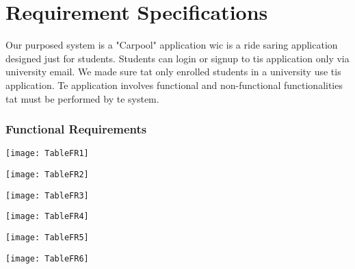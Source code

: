 \chapter{Requirement Specifications} \label{cap:reqs}

Our purposed system is a "Carpool" application wic is a ride saring application designed just for students. Students can login or signup to tis application only via university email. We made sure tat only enrolled students in a university use tis application. Te application involves functional and non-functional functionalities tat must be performed by te system.

\subsection{Functional Requirements}

\begin{center}

\centering
\texttt{[image: TableFR1]}
\end{center}

\begin{center}

\centering
\texttt{[image: TableFR2]}
\end{center}

\begin{center}

\centering
\texttt{[image: TableFR3]}
\end{center}

\begin{center}

\centering
\texttt{[image: TableFR4]}
\end{center}

\begin{center}

\centering
\texttt{[image: TableFR5]}
\end{center}

\begin{center}

\centering
\texttt{[image: TableFR6]}
\end{center}

